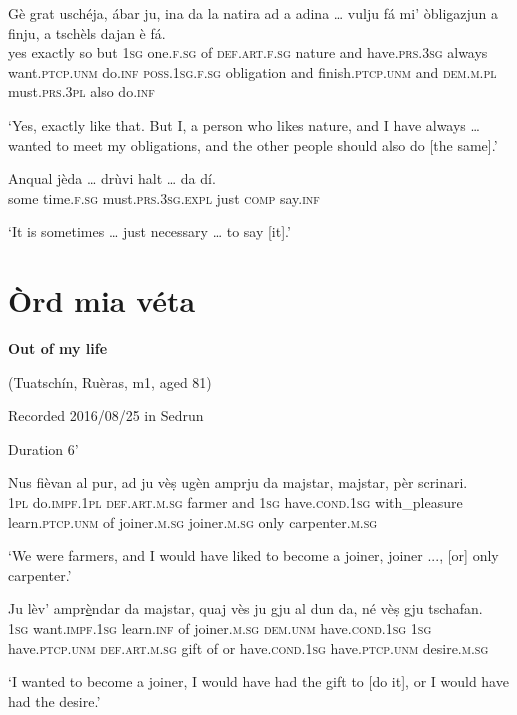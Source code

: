 \begin{linenumbers}
\gll Gè grat uschéja, ábar ju, ina da la natira ad a adina … vulju fá mi' òbligazjun a finju, a tschèls dajan è fá.   \\
yes exactly so but \textsc{1sg} one.\textsc{f.sg} of \textsc{def.art.f.sg} nature and have.\textsc{prs.3sg} always {} want.\textsc{ptcp.unm} do.\textsc{inf} \textsc{poss.1sg.f.sg} obligation and finish.\textsc{ptcp.unm} and \textsc{dem.m.pl} must.\textsc{prs.3pl} also do.\textsc{inf}\\
\end{linenumbers}
\medskip
\glt `Yes, exactly like that. But I, a person who likes nature, and I have always … wanted to meet my obligations, and the other people should also do [the same].'
\medskip

\begin{linenumbers}
\gll  Anqual jèda … drùvi halt … da dí.\\
some time.\textsc{f.sg} {} must.\textsc{prs.3sg.expl} just {} \textsc{comp} say.\textsc{inf}\\
\end{linenumbers}
\medskip
\glt `It is sometimes … just necessary … to say [it].'
\medskip

\section{Òrd mia véta}


\textbf{Out of my life}

\noindent
(Tuatschín, Ruèras, m1, aged 81)

\noindent
Recorded 2016/08/25 in Sedrun

Duration 6'
\bigskip


\begin{linenumbers}
\gll    Nus fièvan al pur, ad ju vèṣ ugèn amprju da majstar, majstar, pèr scrinari.\\
 \textsc{1pl} do.\textsc{impf.1pl} \textsc{def.art.m.sg} farmer and \textsc{1sg} have.\textsc{cond.1sg} with\_pleasure learn.\textsc{ptcp.unm} of joiner.\textsc{m.sg} joiner.\textsc{m.sg} only carpenter.\textsc{m.sg}\\
\end{linenumbers}
\medskip
\glt `We were farmers, and I would have liked to become a joiner, joiner ..., [or] only carpenter.'
\medskip

\begin{linenumbers}
\gll    Ju lèv’ ampr\underline{è}ndar da majstar, quaj vès ju gju al dun da, né vèṣ gju tschafan.\\
 \textsc{1sg} want.\textsc{impf.1sg} learn.\textsc{inf} of joiner.\textsc{m.sg} \textsc{dem.unm} have.\textsc{cond.1sg} \textsc{1sg} have.\textsc{ptcp.unm} \textsc{def.art.m.sg} gift of or have.\textsc{cond.1sg} have.\textsc{ptcp.unm} desire.\textsc{m.sg}\\
\end{linenumbers}
\medskip
\glt `I wanted to become a joiner, I would have had the gift to [do it], or I would have had the desire.'
\medskip

